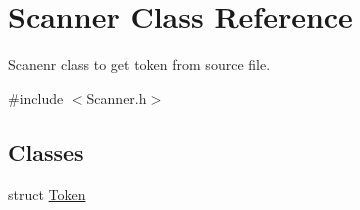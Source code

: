 \hypertarget{class_scanner}{}\section{Scanner Class Reference}
\label{class_scanner}


Scanenr class to get token from source file.  




{\ttfamily \#include $<$Scanner.\+h$>$}

\subsection*{Classes}
\begin{DoxyCompactItemize}
\item 
struct \hyperlink{struct_scanner_1_1_token}{Token}
\end{DoxyCompactItemize}
